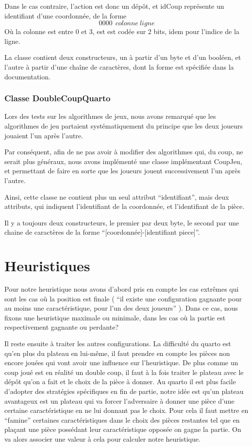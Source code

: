\documentclass{article}
\begin{document}
Dans le cas contraire, l'action est donc un dépôt, et idCoup
représente un identifiant d'une coordonnée, de la forme
\[ 0000~~colonne~ligne\]
O\`u la colonne est entre 0 et 3, est est codée sur 2 bits, idem pour
l'indice de la ligne.

La classe contient deux constructeurs, un à partir d'un byte et d'un
booléen, et l'autre à partir d'une chaîne de caractères, dont la forme
est spécifiée dans la documentation. %


\subsubsection{Classe DoubleCoupQuarto}
Lors des tests sur les algorithmes de jeux, nous avons remarqué que
les algorithmes de jeu partaient systématiquement du principe que les
deux joueurs jouaient l'un après l'autre.

Par conséquent, afin de ne pas avoir à modifier des algorithmes qui,
du coup, ne serait plus généraux, nous avons implémenté une classe
implémentant CoupJeu, et permettant de faire en sorte que les joueurs
jouent successivement l'un après l'autre.

Ainsi, cette classe ne contient plus un seul attribut ``identifiant'',
mais deux attributs, qui indiquent l'identifiant de la coordonnée,
et l'identifiant de la pièce.

Il y a toujours deux constructeurs, le premier par deux byte, le
second par une chaine de caractères de la forme
``[coordonnée]-[identifiant piece]''.


\section{Heuristiques}
Pour notre heuristique nous avons d'abord pris en compte les cas 
extrêmes qui sont les cas o\`u la position est finale
( ``il existe une configuration gagnante pour au moins une
caractéristique, pour l'un des deux joueurs'' ).
 Dans ce cas, nous fixons une heuristique maximale ou minimale, dans
 les cas o\`u la partie est respectivement gagnante ou perdante?


 Il reste ensuite à traiter les autres configurations.
 La difficulté du quarto est qu'en plus du plateau en lui-même,
 il faut prendre en compte les pièces
 non encore jouées qui vont avoir une influence sur l'heuristique.
 De plus comme un coup joué est en réalité un double coup, il faut à la fois
traiter le plateau avec le dépôt qu'on a fait et le choix de la pièce
à donner.
Au quarto il est plus facile d'adopter des stratégies
spécifiques en fin de partie, notre idée est qu’un plateau avantageux
est un plateau qui va forcer l'adversaire à donner une pièce d'une
certaine caractéristique en ne lui donnant pas le choix. Pour cela il
faut mettre en ``famine'' certaines caractéristiques dans le choix des
pièces restantes tel que en plaçant une pièce possédant leur
caractéristique opposée on gagne la partie. On va alors associer une
valeur à cela pour calculer notre heuristique.
\end{document}
